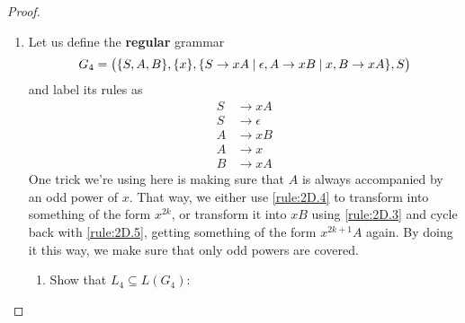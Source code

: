 \documentclass[11pt]{article}
\begin{document}
\begin{proof}
\begin{enumerate}
        \item Let us define the \textbf{regular} grammar 
            \begin{equation}\label{grammar:2.D}
                G_4 = \big(\{S, A, B\}, \{x\}, 
                \{S \to xA \hspace{0.25em}|\hspace{0.25em} \epsilon, 
                A \to xB \hspace{0.25em}|\hspace{0.25em} x,
                B \to xA\}, S\big)
            \end{equation}
        and label its rules as
        \begin{align}
            S &\to xA \label{rule:2D.1} \\
            S &\to \epsilon \label{rule:2D.2} \\
            A &\to xB \label{rule:2D.3} \\
            A &\to x \label{rule:2D.4} \\
            B &\to xA \label{rule:2D.5}
        \end{align}
        One trick we're using here is making sure that $A$ is always accompanied
        by an odd power of $x$. That way, we either use \eqref{rule:2D.4} to transform
        into something of the form $x^{2k}$, or transform it into $xB$ using 
        \eqref{rule:2D.3} and cycle back with \eqref{rule:2D.5}, getting something of
        the form $x^{2k + 1}A$ again. By doing it this way, we make sure that
        only odd powers are covered.
        \begin{enumerate}
            \item Show that $L_4 \subseteq L(G_4)$:


\end{enumerate}
\end{enumerate}
\end{proof}
\end{document}
